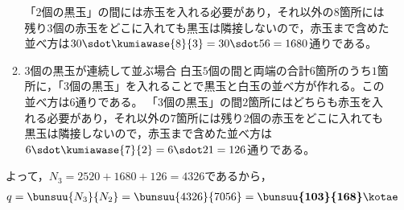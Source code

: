 \documentclass[../../../doc/main]{subfiles}
\begin{document}
\begin{enumerate}
\begin{enumerate}
                「2個の黒玉」の間には赤玉を入れる必要があり，それ以外の$ 8 $箇所には残り$ 3 $個の赤玉をどこに入れても黒玉は隣接しないので，赤玉まで含めた並べ方は$ 30 \sdot \kumiawase{8}{3} = 30 \sdot 56 = 1680 $通りである。
            \item [\tokeisan]
                $ 3 $個の黒玉が連続して並ぶ場合
                白玉$ 5 $個の間と両端の合計$ 6 $箇所のうち$ 1 $箇所に，「3個の黒玉」を入れることで黒玉と白玉の並べ方が作れる。この並べ方は$ 6 $通りである。
                「3個の黒玉」の間$ 2 $箇所にはどちらも赤玉を入れる必要があり，それ以外の$ 7 $箇所には残り$ 2 $個の赤玉をどこに入れても黒玉は隣接しないので，赤玉まで含めた並べ方は$ 6 \sdot \kumiawase{7}{2} = 6 \sdot 21 = 126 $通りである。
            \end{enumerate}
        よって，$ N_3 = 2520 + 1680 + 126 = 4326 $であるから，
        \begin{align*}
            q = \bunsuu{N_3}{N_2} = \bunsuu{4326}{7056} = \boldsymbol{\bunsuu{103}{168}} \kotae
        \end{align*}
    \end{enumerate}
\end{document}
